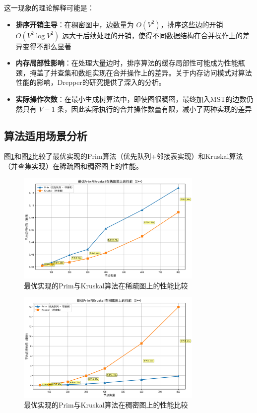 \documentclass[a4paper,12pt]{ctexart}
\begin{document}
这一现象的理论解释可能是：
\begin{itemize}
    \item \textbf{排序开销主导}：在稠密图中，边数量为 $O(V^2)$，排序这些边的开销 $O(V^2 \log V^2)$ 远大于后续处理的开销，使得不同数据结构在合并操作上的差异变得不那么显著
    \item \textbf{内存局部性影响}：在处理大量边时，排序算法的缓存局部性可能成为性能瓶颈，掩盖了并查集和数组实现在合并操作上的差异。关于内存访问模式对算法性能的影响，Drepper的研究\cite{cache_locality}提供了深入的分析。
    \item \textbf{实际操作次数}：在最小生成树算法中，即使图很稠密，最终加入MST的边数仍然只有 $V-1$ 条，因此实际执行的合并操作数量有限，减小了两种实现的差异
\end{itemize}

\subsection{算法适用场景分析}
图\ref{fig:optimal_sparse}和图\ref{fig:optimal_dense}比较了最优实现的Prim算法（优先队列+邻接表实现）和Kruskal算法（并查集实现）在稀疏图和稠密图上的性能。

\begin{figure}[htbp]
    \centering
    \includegraphics[width=0.8\textwidth]{img/img_cpp2/optimal_sparse_comparison_cpp.png}
    \caption{最优实现的Prim与Kruskal算法在稀疏图上的性能比较}
    \label{fig:optimal_sparse}
\end{figure}

\begin{figure}[htbp]
    \centering
    \includegraphics[width=0.8\textwidth]{img/img_cpp2/optimal_dense_comparison_cpp.png}
    \caption{最优实现的Prim与Kruskal算法在稠密图上的性能比较}
    \label{fig:optimal_dense}
\end{figure}
\end{document}
